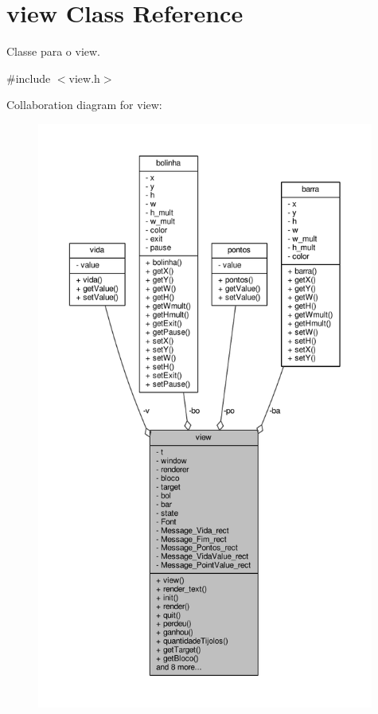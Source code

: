 \hypertarget{classview}{}\section{view Class Reference}
\label{classview}


Classe para o view.  




{\ttfamily \#include $<$view.\+h$>$}



Collaboration diagram for view\+:
\nopagebreak
\begin{figure}[H]
\begin{center}
\leavevmode
\includegraphics[height=550pt]{classview__coll__graph}
\end{center}
\end{figure}
